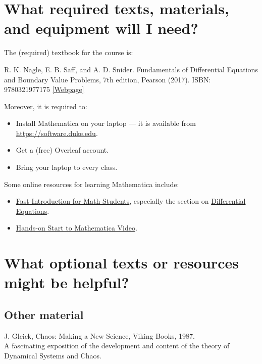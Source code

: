 \documentclass[11pt]{article}
\newcommand{\push}{\hangpara{2em}{1}}
\begin{document}

\section{What required texts, materials, and equipment will I need?}

The (required) textbook for the course is:

R. K. Nagle, E. B. Saff, and A. D. Snider. Fundamentals of Differential Equations and Boundary Value Problems, 7th edition, Pearson (2017). ISBN: 9780321977175
\href{https://www.pearson.com/store/p/fundamentals-of-differential-equations-and-boundary-value-problems/P100002446580}{[Webpage]}

Moreover, it is required to:
\begin{itemize}[label={-},noitemsep]
\item Install Mathematica on your laptop — it is available from \url{https://software.duke.edu}.
\item Get a (free) Overleaf account. 
\item Bring your laptop to every class.
\end{itemize}

Some online resources for learning Mathematica include:
\begin{itemize}[label={-},noitemsep]
\item \href{https://www.wolfram.com/language/fast-introduction-for-math-students/en/}{Fast Introduction for Math Students}, especially the section on \href{https://www.wolfram.com/language/fast-introduction-for-math-students/en/differential-equations/}{Differential Equations}.
\item \href{https://www.wolfram.com/wolfram-u/catalog/gen005/}{Hands-on Start to Mathematica Video}.
\end{itemize}



\section{What optional texts or resources might be helpful?}

\subsection{Other material}

\push J. Gleick, Chaos: Making a New Science, Viking Books, 1987. \\
A fascinating exposition of the development and content of the theory of Dynamical Systems and Chaos.
\end{document}
